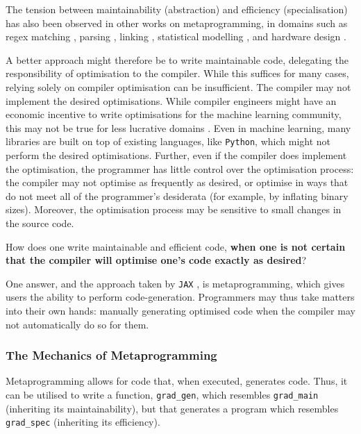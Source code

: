 The tension between maintainability (abstraction) and efficiency (specialisation) has also been observed in other works on metaprogramming, in domains such as regex matching \citep{tratt-2008}, parsing \citep{yallop-2023}, linking \citep{servetto-2013}, statistical modelling \citep{wickham-2019}, and hardware design \citep{vandebon-2021}.

A better approach might therefore be to write maintainable code, delegating the responsibility of optimisation to the compiler. While this suffices for many cases, relying solely on compiler optimisation can be insufficient. The compiler may not implement the desired optimisations. While compiler engineers might have an economic incentive to write optimisations for the machine learning community, this may not be true for less lucrative domains \citep{robinson-01}. Even in machine learning, many libraries are built on top of existing languages, like \texttt{Python}, which might not perform the desired optimisations. Further, even if the compiler does implement the optimisation, the programmer has little control over the optimisation process: the compiler may not optimise as frequently as desired, or optimise in ways that do not meet all of the programmer's desiderata (for example, by inflating binary sizes). Moreover, the optimisation process may be sensitive to small changes in the source code.

How does one write maintainable and efficient code, \textbf{when one is not certain that the compiler will optimise one's code exactly as desired}?

One answer, and the approach taken by \texttt{JAX} \citep{jax-grad-metaprogramming}, is metaprogramming, which gives users the ability to perform code-generation. Programmers may thus take matters into their own hands: manually generating optimised code when the compiler may not automatically do so for them. 

\subsubsection{The Mechanics of Metaprogramming}
Metaprogramming allows for code that, when executed, generates code. Thus, it can be utilised to write a function, \texttt{grad_gen}, which resembles \texttt{grad_main} (inheriting its maintainability), but that generates a program which resembles \texttt{grad_spec} (inheriting its efficiency). 


